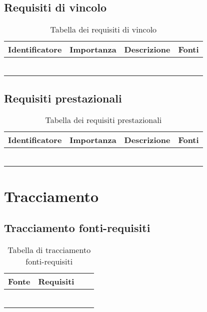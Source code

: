 \documentclass[AnalisiDeiRequisiti.tex]{subfiles}
\begin{document}
\subsection{Requisiti di vincolo}

\label{table:Tabella requisiti di vincolo}
\begin{longtable}[H]{|l|l|l|l|}
	\hline
	\rowcolor[HTML]{38FFF8} 
	\textbf{Identificatore} & \textbf{Importanza} & \textbf{Descrizione} & \textbf{Fonti} \\ \hline
	\endhead
	&  &  &  \\ \hline
	&  &  &  \\ \hline
	&  &  &  \\ \hline
	&  &  &  \\ \hline
	&  &  &  \\ \hline
	\caption{Tabella dei requisiti di vincolo}
\end{longtable}

\subsection{Requisiti prestazionali}

\label{table:Tabella requisiti prestazionali}
\begin{longtable}[H]{|l|l|l|l|}
	\hline
	\rowcolor[HTML]{38FFF8} 
	\textbf{Identificatore} & \textbf{Importanza} & \textbf{Descrizione} & \textbf{Fonti} \\ \hline
	\endhead
	&  &  &  \\ \hline
	&  &  &  \\ \hline
	&  &  &  \\ \hline
	&  &  &  \\ \hline
	&  &  &  \\ \hline
	\caption{Tabella dei requisiti prestazionali}
\end{longtable}

\section{Tracciamento}
\subsection{Tracciamento fonti-requisiti}

\label{table:Tabella di tracciamento fonti-requisiti}
\begin{longtable}[H]{|l|l|l|l|}
	\hline
	\rowcolor[HTML]{38FFF8} 
	\textbf{Fonte} & \textbf{Requisiti} \\ \hline
	\endhead
	&  \\ \hline
	&  \\ \hline
	&  \\ \hline
	&  \\ \hline
	&  \\ \hline
	\caption{Tabella di tracciamento fonti-requisiti}
\end{longtable}
\end{document}
